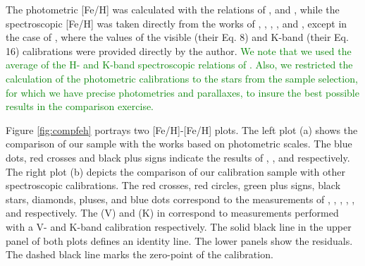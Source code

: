 \documentclass{aa}
\begin{document}
The photometric [Fe/H] was calculated with the relations of \citet{Bonfils-2005}, \citet{Schlaufman-2010} and \citet{Johnson-2012}, while the spectroscopic [Fe/H] was taken directly from the works of  \citet{Rojas-Ayala-2012}, \citet{Onehag-2012}, \citet{Terrien-2012}, \citet{Newton-2013}, and \citet{Mann-2013b}, except in the case of \citet{Mann-2013a}, where the values of the visible (their Eq. 8) and K-band (their Eq. 16) calibrations were provided directly by the author. \textcolor{green}{We note that we used the average of the H- and K-band spectroscopic relations of \citet{Terrien-2012}. Also, we restricted the calculation of the photometric calibrations to the stars from the sample selection, for which we have precise photometries and parallaxes, to insure the best possible results in the comparison exercise.} 

Figure \ref{fig:compfeh} portrays two [Fe/H]-[Fe/H] plots. The left plot (a) shows the comparison of our sample with the works based on photometric scales. The blue dots, red crosses and black plus signs indicate the results of \citet{Bonfils-2005}, \citet{Schlaufman-2010}, and \citet{Johnson-2012} respectively. The right plot (b) depicts the comparison of our calibration sample with other spectroscopic calibrations. The red crosses, red circles, green plus signs, black stars, diamonds, pluses, and blue dots correspond to the measurements of \citet{Rojas-Ayala-2012}, \citet{Onehag-2012}, \citet{Terrien-2012}, \citet{Mann-2013a}, \citet{Mann-2013b}, and \citet{Newton-2013} respectively. The (V) and (K) in \citet{Mann-2013a} correspond to measurements performed with a V- and K-band calibration respectively. The solid black line in the upper panel of both plots defines an identity line. The lower panels show the residuals. The dashed black line marks the zero-point of the calibration.
\end{document}
